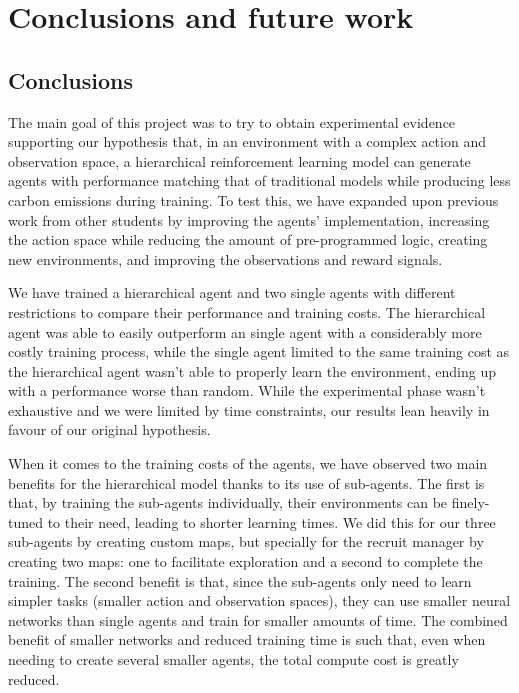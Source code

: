 \chapter{Conclusions and future work}
\label{chapter:conclusions}

\section{Conclusions}

The main goal of this project was to try to obtain experimental evidence supporting our hypothesis that, in an environment with a complex action and observation space, a hierarchical reinforcement learning model can generate agents with performance matching that of traditional models while producing less carbon emissions during training. To test this, we have expanded upon previous work from other students by improving the agents' implementation, increasing the action space while reducing the amount of pre-programmed logic, creating new environments, and improving the observations and reward signals.

We have trained a hierarchical agent and two single agents with different restrictions to compare their performance and training costs. The hierarchical agent was able to easily outperform an single agent with a considerably more costly training process, while the single agent limited to the same training cost as the hierarchical agent wasn't able to properly learn the environment, ending up with a performance worse than random. While the experimental phase wasn't exhaustive and we were limited by time constraints, our results lean heavily in favour of our original hypothesis.

When it comes to the training costs of the agents, we have observed two main benefits for the hierarchical model thanks to its use of sub-agents. The first is that, by training the sub-agents individually, their environments can be finely-tuned to their need, leading to shorter learning times. We did this for our three sub-agents by creating custom maps, but specially for the recruit manager by creating two maps: one to facilitate exploration and a second to complete the training. The second benefit is that, since the sub-agents only need to learn simpler tasks (smaller action and observation spaces), they can use smaller neural networks than single agents and train for smaller amounts of time. The combined benefit of smaller networks and reduced training time is such that, even when needing to create several smaller agents, the total compute cost is greatly reduced.


